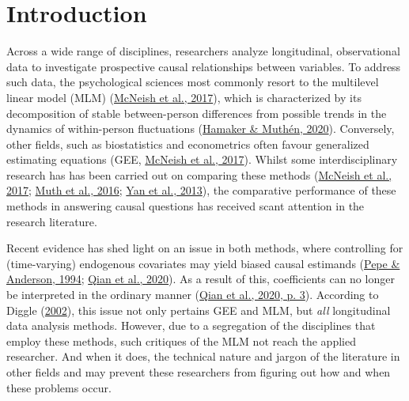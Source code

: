 \documentclass[
  12pt,
  a4paper,
]{article}
\begin{document}
\pagestyle{fancy}
  \fancyhead{}


\newpage

\hypertarget{introduction}{%
\section{Introduction}\label{introduction}}

Across a wide range of disciplines, researchers analyze longitudinal,
observational data to investigate prospective causal relationships
between variables. To address such data, the psychological sciences most
commonly resort to the multilevel linear model (MLM)
(\protect\hyperlink{ref-mcneish2017}{McNeish et al., 2017}), which is
characterized by its decomposition of stable between-person differences
from possible trends in the dynamics of within-person fluctuations
(\protect\hyperlink{ref-hamaker2020}{Hamaker \& Muthén, 2020}).
Conversely, other fields, such as biostatistics and econometrics often
favour generalized estimating equations (GEE,
\protect\hyperlink{ref-mcneish2017}{McNeish et al., 2017}). Whilst some
interdisciplinary research has has been carried out on comparing these
methods (\protect\hyperlink{ref-mcneish2017}{McNeish et al., 2017};
\protect\hyperlink{ref-muth2016}{Muth et al., 2016};
\protect\hyperlink{ref-yan2013}{Yan et al., 2013}), the comparative
performance of these methods in answering causal questions has received
scant attention in the research literature.

Recent evidence has shed light on an issue in both methods, where
controlling for (time-varying) endogenous covariates may yield biased
causal estimands (\protect\hyperlink{ref-pepe1994}{Pepe \& Anderson,
1994}; \protect\hyperlink{ref-qian2020}{Qian et al., 2020}). As a result
of this, coefficients can no longer be interpreted in the ordinary
manner (\protect\hyperlink{ref-qian2020}{Qian et al., 2020, p. 3}).
According to Diggle (\protect\hyperlink{ref-diggle2002}{2002}), this
issue not only pertains GEE and MLM, but \emph{all} longitudinal data
analysis methods. However, due to a segregation of the disciplines that
employ these methods, such critiques of the MLM not reach the applied
researcher. And when it does, the technical nature and jargon of the
literature in other fields and may prevent these researchers from
figuring out how and when these problems occur.
\end{document}
